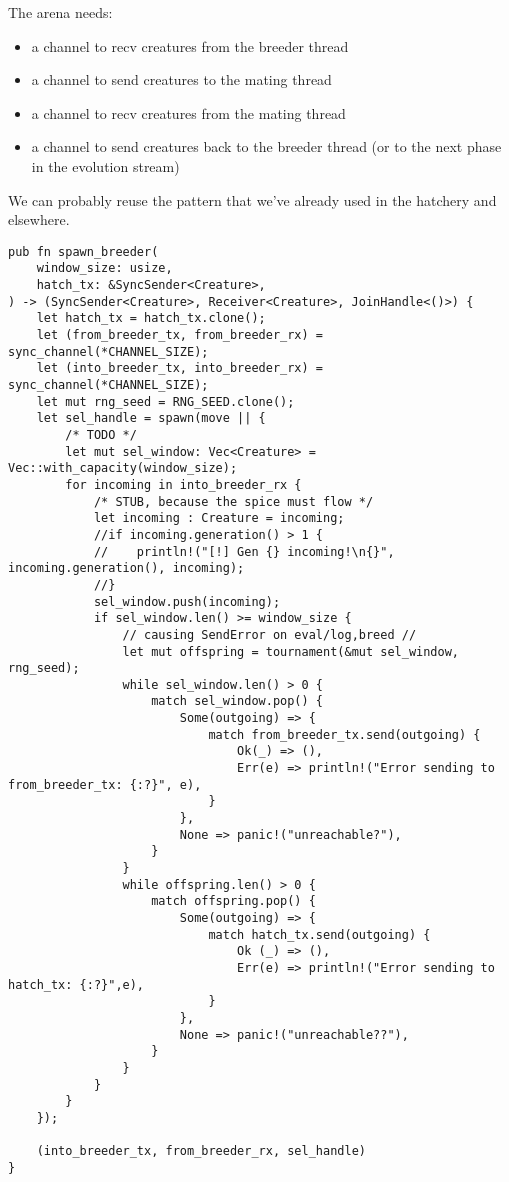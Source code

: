 \documentclass[11pt]{article}
\begin{document}
The arena needs:
\begin{itemize}
\item a channel to recv creatures from the breeder thread
\item a channel to send creatures to the mating thread
\item a channel to recv creatures from the mating thread
\item a channel to send creatures back to the breeder thread
(or to the next phase in the evolution stream)
\end{itemize}

We can probably reuse the pattern that we've already used in
the hatchery and elsewhere. 


\lstset{language=rust,label=org994fc65,caption= ,captionpos=b,numbers=none}
\begin{lstlisting}
pub fn spawn_breeder(
    window_size: usize,
    hatch_tx: &SyncSender<Creature>,
) -> (SyncSender<Creature>, Receiver<Creature>, JoinHandle<()>) {
    let hatch_tx = hatch_tx.clone();
    let (from_breeder_tx, from_breeder_rx) = sync_channel(*CHANNEL_SIZE);
    let (into_breeder_tx, into_breeder_rx) = sync_channel(*CHANNEL_SIZE);
    let mut rng_seed = RNG_SEED.clone();
    let sel_handle = spawn(move || {
        /* TODO */
        let mut sel_window: Vec<Creature> = Vec::with_capacity(window_size);
        for incoming in into_breeder_rx {
            /* STUB, because the spice must flow */
            let incoming : Creature = incoming;
            //if incoming.generation() > 1 {
            //    println!("[!] Gen {} incoming!\n{}", incoming.generation(), incoming);
            //}
            sel_window.push(incoming);
            if sel_window.len() >= window_size {
                // causing SendError on eval/log,breed //
                let mut offspring = tournament(&mut sel_window, rng_seed);
                while sel_window.len() > 0 {
                    match sel_window.pop() {
                        Some(outgoing) => {
                            match from_breeder_tx.send(outgoing) {
                                Ok(_) => (),
                                Err(e) => println!("Error sending to from_breeder_tx: {:?}", e),
                            }
                        },
                        None => panic!("unreachable?"),
                    }
                }
                while offspring.len() > 0 {
                    match offspring.pop() {
                        Some(outgoing) => {
                            match hatch_tx.send(outgoing) {
                                Ok (_) => (),
                                Err(e) => println!("Error sending to hatch_tx: {:?}",e),
                            }
                        },
                        None => panic!("unreachable??"),
                    }
                }
            }
        }
    });

    (into_breeder_tx, from_breeder_rx, sel_handle)
}
\end{lstlisting}
\end{document}
